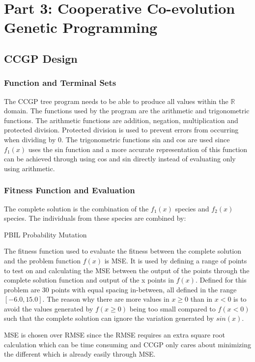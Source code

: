 \documentclass{article}
\begin{document}
\section*{Part 3: Cooperative Co-evolution Genetic Programming}
\subsection*{CCGP Design}
\subsubsection*{Function and Terminal Sets}
The CCGP tree program needs to be able to produce all values within the $\mathbb{R}$ domain. The functions used by the program are the arithmetic and trigonometric functions. The arithmetic functions are addition, negation, multiplication and protected division. Protected division is used to prevent errors from occurring when dividing by 0. The trigonometric functions sin and cos are used since $f_1(x)$ uses the sin function and a more accurate representation of this function can be achieved through using cos and sin directly instead of evaluating only using arithmetic.  \par
\subsubsection*{Fitness Function and Evaluation}
The complete solution is the combination of the $ f_1(x) $ species and $f_2(x)$ species. The individuals from these species are combined by: 
\begin{algorithm}
	\caption{PBIL Probability Mutation}
	\begin{algorithmic}
		\Else
		\EndIf
	\end{algorithmic}
\end{algorithm}
The fitness function used to evaluate the fitness between the complete solution and the problem function $f(x)$ is MSE. It is used by defining a range of points to test on and calculating the MSE between the output of the points through the complete solution function and output of the x points in $f(x)$. Defined for this problem are 30 points with equal spacing in-between, all defined in the range $[-6.0, 15.0]$. The reason why there are more values in $x \ge 0$ than in $x < 0$ is to avoid the values generated by $f(x \ge 0)$ being too small compared to $f(x < 0)$ such that the complete solution can ignore the variation generated by $sin(x)$. \par
\noindent MSE is chosen over RMSE since the RMSE requires an extra square root calculation which can be time consuming and CCGP only cares about minimizing the different which is already easily through MSE. \par
\end{document}
